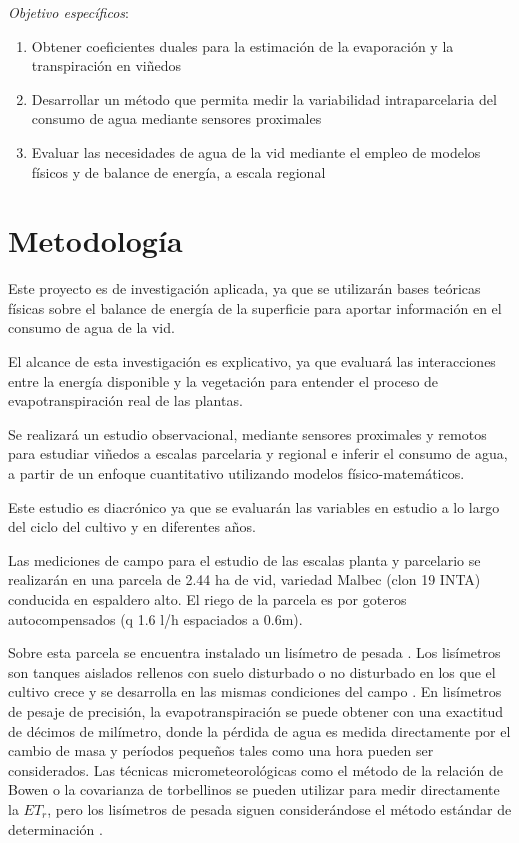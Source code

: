 \documentclass[]{article}
\begin{document}
\textit{Objetivo específicos}: 
\begin{enumerate}
	\item Obtener coeficientes duales para la estimación de la evaporación y la transpiración en viñedos
	\item Desarrollar un método que permita medir la variabilidad intraparcelaria del consumo de agua mediante sensores proximales
	\item Evaluar las necesidades de agua de la vid mediante el empleo de modelos físicos y de balance de energía, a escala regional
\end{enumerate}

\section{Metodología}

Este proyecto es de investigación aplicada, ya que se utilizarán bases teóricas físicas sobre el balance de energía de la superficie para aportar información en el consumo de agua de la vid.

El alcance de esta investigación es explicativo,  ya que evaluará las interacciones entre la energía  disponible  y la vegetación para entender el proceso de evapotranspiración real de las plantas.

Se realizará un estudio observacional, mediante sensores proximales y remotos para estudiar viñedos a escalas parcelaria y regional e inferir el consumo de agua, a partir de un enfoque cuantitativo utilizando modelos físico-matemáticos.

Este estudio es diacrónico ya que se evaluarán las variables en estudio a lo largo del ciclo del cultivo y en diferentes años.

Las mediciones de campo para el estudio de las escalas planta y parcelario se realizarán en una parcela de 2.44 ha de vid, variedad Malbec (clon 19 INTA) conducida en espaldero alto. El riego de la parcela es por goteros autocompensados (q 1.6 l/h espaciados a 0.6m). 

Sobre esta parcela se encuentra instalado un lisímetro de pesada \citep{Olmedo2012}. Los lisímetros son tanques  aislados rellenos con suelo disturbado o no disturbado en los que el cultivo crece  y se desarrolla en las mismas condiciones del campo \citep{Montoro2008}. En lisímetros de pesaje de precisión, la evapotranspiración se puede obtener con una exactitud de décimos de milímetro, donde la pérdida de agua es medida directamente por el cambio de masa y períodos pequeños tales como una hora pueden ser considerados. 
Las técnicas micrometeorológicas como el método de la relación de Bowen o la covarianza de torbellinos se pueden utilizar para medir directamente la $ET_r$, pero los lisímetros de pesada siguen considerándose el método estándar de determinación \citep{Payero2008}.
\end{document}
